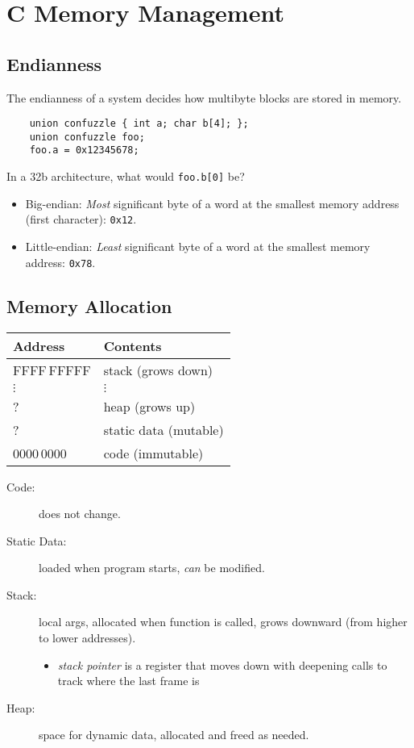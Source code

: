 \chapter{C Memory Management}

\section{Endianness}
The endianness of a system decides how multibyte blocks are stored in memory.
\begin{verbatim}
    union confuzzle { int a; char b[4]; };
    union confuzzle foo;
    foo.a = 0x12345678;
\end{verbatim}
In a 32b architecture, what would \texttt{foo.b[0]} be?
\begin{itemize}
    \item Big-endian: \emph{Most} significant byte of a word at the smallest memory address (first character): \texttt{0x12}.
     
    \item Little-endian: \emph{Least} significant byte of a word at the smallest memory address: \texttt{0x78}.
\end{itemize}

\section{Memory Allocation}
\begin{tabular}{ll}
	Address & Contents\\\hline
	FFFF\,FFFFF & stack (grows down)\\
	\(\vdots\) & \(\vdots\) \\
	? & heap (grows up) \\
	? & static data (mutable) \\
	0000\,0000 & code (immutable)
\end{tabular}
\begin{description}
	\item[Code:] does not change.
	\item[Static Data:] loaded when program starts, \emph{can} be modified.
	\item[Stack:] local args, allocated when function is called, grows downward (from higher to lower addresses).
		\begin{itemize}
			\item \emph{stack pointer} is a register that moves down with deepening calls to track where the last frame is
		\end{itemize}
	\item[Heap:] space for dynamic data, allocated and freed as needed.
\end{description}

